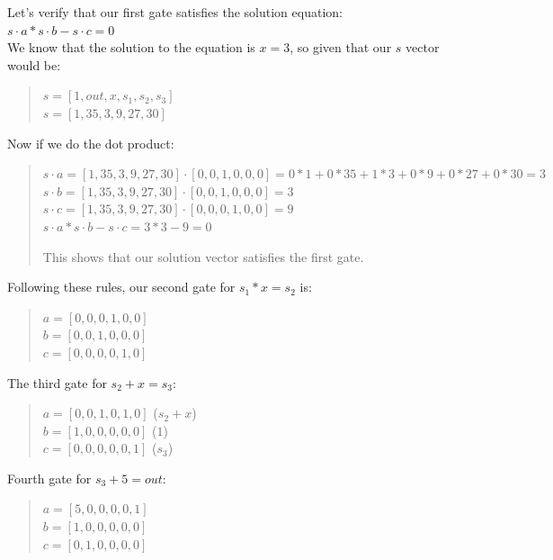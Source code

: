    Let's verify that our first gate satisfies the solution equation:
   \\
   $s \cdot a * s \cdot b - s \cdot c = 0$
   \\
   We know that the solution to the equation is $ x = 3 $, so given that our $s$ vector
   would be: 
   \begin{quote}
   $s=[1,out,x,s_1,s_2,s_3]$
   \\
   $s=[1,35,3,9,27,30]$
\end{quote}

Now if we do the dot product:
\begin{quote}
   $s \cdot a =  [1,35,3,9,27,30] \cdot [0,0,1,0,0,0] = 0*1+0*35+1*3+0*9+0*27+0*30= 3$ 
   $s \cdot b = [1,35,3,9,27,30] \cdot [0,0,1,0,0,0] = 3$ 
   $s \cdot c = [1,35,3,9,27,30] \cdot [0,0,0,1,0,0] = 9$ 
$s \cdot a * s \cdot b - s \cdot c =  3 * 3 - 9 = 0$

This shows that our solution vector satisfies the first gate.
\end{quote}

Following these rules, our second gate for $s_1*x=s_2$ is:
\begin{quote}
   $a = [0,0,0,1,0,0]$
   \\
   $b = [0,0,1,0,0,0]$
   \\
   $c = [0,0,0,0,1,0]$
\end{quote}

The third gate for $s_2+x=s_3$:
\begin{quote}
   $a = [0,0,1,0,1,0]$ ($s_2+x$)
   \\
   $b = [1,0,0,0,0,0]$ ($1$)
   \\
   $c = [0,0,0,0,0,1]$ ($s_3$)
\end{quote}

Fourth gate for $s_3+5=out$:
\begin{quote}
   $a = [5,0,0,0,0,1]$
   \\
   $b = [1,0,0,0,0,0]$
   \\
   $c = [0,1,0,0,0,0]$
\end{quote}

